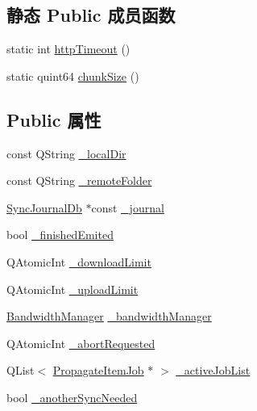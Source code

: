 \subsection*{静态 Public 成员函数}
\begin{DoxyCompactItemize}
\item 
static int \hyperlink{class_o_c_c_1_1_owncloud_propagator_a3e27712c81f88179dcdcd94e1a8e4431}{http\+Timeout} ()
\item 
static quint64 \hyperlink{class_o_c_c_1_1_owncloud_propagator_a3932867fca1b6e8c53ec5387c69708a4}{chunk\+Size} ()
\end{DoxyCompactItemize}
\subsection*{Public 属性}
\begin{DoxyCompactItemize}
\item 
const Q\+String \hyperlink{class_o_c_c_1_1_owncloud_propagator_ab36bd049c56d4e5e76a9fcbbdf2d7230}{\+\_\+local\+Dir}
\item 
const Q\+String \hyperlink{class_o_c_c_1_1_owncloud_propagator_af1db4c1fcff6c012e372de47c1814b12}{\+\_\+remote\+Folder}
\item 
\hyperlink{class_o_c_c_1_1_sync_journal_db}{Sync\+Journal\+Db} $\ast$const \hyperlink{class_o_c_c_1_1_owncloud_propagator_add49de94586382a0f18ecf417dc389f8}{\+\_\+journal}
\item 
bool \hyperlink{class_o_c_c_1_1_owncloud_propagator_a9cde1633042a8343d0fede4589fc09f7}{\+\_\+finished\+Emited}
\item 
Q\+Atomic\+Int \hyperlink{class_o_c_c_1_1_owncloud_propagator_abe6e16eae30c09e6a40f309aaec85766}{\+\_\+download\+Limit}
\item 
Q\+Atomic\+Int \hyperlink{class_o_c_c_1_1_owncloud_propagator_a5d180311654080414fd82638ad64467d}{\+\_\+upload\+Limit}
\item 
\hyperlink{class_o_c_c_1_1_bandwidth_manager}{Bandwidth\+Manager} \hyperlink{class_o_c_c_1_1_owncloud_propagator_a9fd7eb3234acf295e37c94414fca0867}{\+\_\+bandwidth\+Manager}
\item 
Q\+Atomic\+Int \hyperlink{class_o_c_c_1_1_owncloud_propagator_a492f3a3d5faea06844955209aa0a70c1}{\+\_\+abort\+Requested}
\item 
Q\+List$<$ \hyperlink{class_o_c_c_1_1_propagate_item_job}{Propagate\+Item\+Job} $\ast$ $>$ \hyperlink{class_o_c_c_1_1_owncloud_propagator_a5f04bef49c8ac2fb7b4f2fddbc022219}{\+\_\+active\+Job\+List}
\item 
bool \hyperlink{class_o_c_c_1_1_owncloud_propagator_abefc3d008a6bab7e5d22c8d03066b6f5}{\+\_\+another\+Sync\+Needed}
\end{DoxyCompactItemize}


